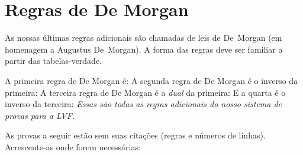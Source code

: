 \section{Regras de De Morgan}
As nossas últimas regras adicionais são chamadas de leis de De~Morgan (em homenagem a Augustus De~Morgan). A forma das regras deve ser familiar a partir das tabelas-verdade.

A primeira regra de De Morgan é:
A segunda regra de De Morgan é o inverso da primeira:
A terceira regra de De Morgan é a \emph{dual} da primeira:
E a quarta é o inverso da terceira:
\emph{Essas são todas as regras adicionais do nosso sistema de provas para a LVF.}

\practiceproblems
\solutions
\problempart
\label{pr.justifyTFLproof}
As provas a seguir estão sem suas citações (regras e números de linhas). Acrescente-as onde forem necessárias:
\begin{compactlist}
\item\begin{fitchproof}
 {}
 {}
\end{fitchproof}
\item\begin{fitchproof}
\open
\close
{}
\end{fitchproof}
\item\begin{fitchproof}
\open
	 {}
		\open
	\close
\close
{}
\end{fitchproof}
\end{compactlist}

